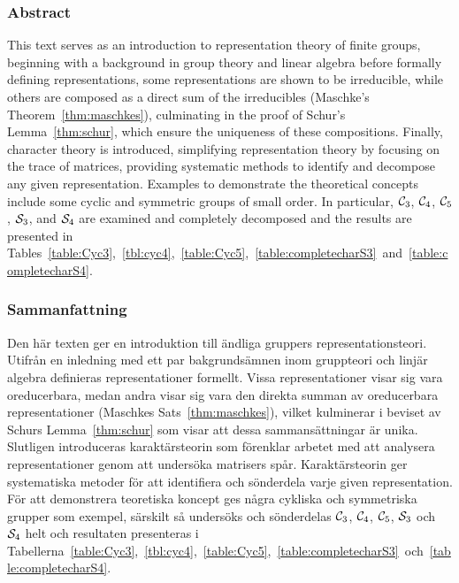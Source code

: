 \clearpage{\thispagestyle{empty}}
\begin{center}
	\subsubsection*{Abstract}
\end{center}

	This text serves as an introduction to representation theory of finite groups, beginning with a background in group theory and linear algebra before formally defining representations, some representations are shown to be irreducible, while others are composed as a direct sum of the irreducibles (Maschke's Theorem~\ref{thm:maschkes}), culminating in the proof of Schur's Lemma~\ref{thm:schur}, which ensure the uniqueness of these compositions. Finally, character theory is introduced, simplifying representation theory by focusing on the trace of matrices, providing systematic methods to identify and decompose any given representation. Examples to demonstrate the theoretical concepts include some cyclic and symmetric groups of small order. In particular, $\mathcal{C}_3$, $\mathcal{C}_4$, $\mathcal{C}_5$, $\mathcal{S}_3$, and $\mathcal{S}_4$ are examined and completely decomposed and the results are presented in Tables~\ref{table:Cyc3},~\ref{tbl:cyc4},~\ref{table:Cyc5},~\ref{table:completecharS3}~and~\ref{table:completecharS4}.
		
\begin{center}
	\item\subsubsection*{Sammanfattning}
	
\end{center}

	Den här texten ger en introduktion till  ändliga gruppers representationsteori. Utifrån en inledning med ett par bakgrundsämnen inom gruppteori och linjär algebra definieras representationer formellt. Vissa representationer visar sig vara oreducerbara, medan andra visar sig vara den direkta summan av oreducerbara representationer (Maschkes Sats~\ref{thm:maschkes}), vilket kulminerar i beviset av  Schurs Lemma~\ref{thm:schur} som visar att dessa sammansättningar är unika. Slutligen introduceras karaktärsteorin som förenklar arbetet med att analysera representationer genom att undersöka matrisers spår. Karaktärsteorin ger systematiska metoder för att identifiera och sönderdela varje given representation. För att demonstrera teoretiska koncept ges några cykliska och symmetriska grupper som exempel, särskilt så undersöks och sönderdelas $\mathcal{C}_3$, $\mathcal{C}_4$, $\mathcal{C}_5$, $\mathcal{S}_3$ och $\mathcal{S}_4$ helt och resultaten presenteras i Tabellerna~\ref{table:Cyc3},~\ref{tbl:cyc4},~\ref{table:Cyc5},~\ref{table:completecharS3}~och~\ref{table:completecharS4}.
	
